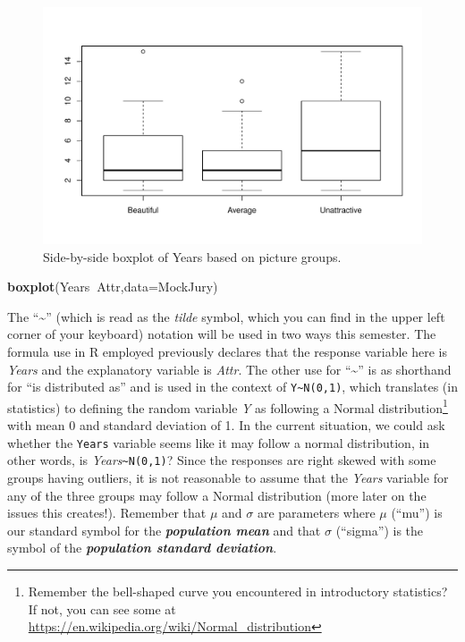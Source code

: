 \documentclass[]{book}
\newenvironment{Shaded}{\begin{snugshade}}{\end{snugshade}}
\newcommand{\KeywordTok}[1]{\textcolor[rgb]{0.13,0.29,0.53}{\textbf{#1}}}
\newcommand{\DataTypeTok}[1]{\textcolor[rgb]{0.13,0.29,0.53}{#1}}
\newcommand{\OperatorTok}[1]{\textcolor[rgb]{0.81,0.36,0.00}{\textbf{#1}}}
\newcommand{\NormalTok}[1]{#1}
\let\rmarkdownfootnote\footnote%
\def\footnote{\protect\rmarkdownfootnote}
\theoremstyle{definition}
\theoremstyle{definition}
\theoremstyle{remark}
\begin{document}
\begin{figure}
\centering
\includegraphics{02-reintroductionToStatistics_files/figure-latex/Figure2-4-1.pdf}
\caption{\label{fig:Figure2-4}Side-by-side boxplot of Years based on picture groups.}
\end{figure}

\begin{Shaded}
\begin{Highlighting}[]
\KeywordTok{boxplot}\NormalTok{(Years}\OperatorTok{~}\NormalTok{Attr,}\DataTypeTok{data=}\NormalTok{MockJury)}
\end{Highlighting}
\end{Shaded}

The ``\textasciitilde{}'' (which is read as the \emph{tilde} symbol,
which you can find in the upper left corner of your keyboard) notation
will be used in two ways this semester. The formula use in R employed
previously declares that the response variable here is \emph{Years} and
the explanatory variable is \emph{Attr}. The other use for
``\textasciitilde{}'' is as shorthand for ``is distributed as'' and is
used in the context of \texttt{Y\textasciitilde{}N(0,1)}, which
translates (in statistics) to defining the random variable \emph{Y} as
following a Normal distribution\footnote{Remember the bell-shaped curve
  you encountered in introductory statistics? If not, you can see some
  at \url{https://en.wikipedia.org/wiki/Normal_distribution}} with mean
0 and standard deviation of 1. In the current situation, we could ask
whether the \texttt{Years} variable seems like it may follow a normal
distribution, in other words, is
\emph{Years}\texttt{\textasciitilde{}N(0,1)}? Since the responses are
right skewed with some groups having outliers, it is not reasonable to
assume that the \emph{Years} variable for any of the three groups may
follow a Normal distribution (more later on the issues this creates!).
Remember that \(\mu\) and \(\sigma\) are parameters where \(\mu\)
(``mu'') is our standard symbol for the \textbf{\emph{population mean}}
and that \(\sigma\) (``sigma'') is the symbol of the
\textbf{\emph{population standard deviation}}.
\end{document}
